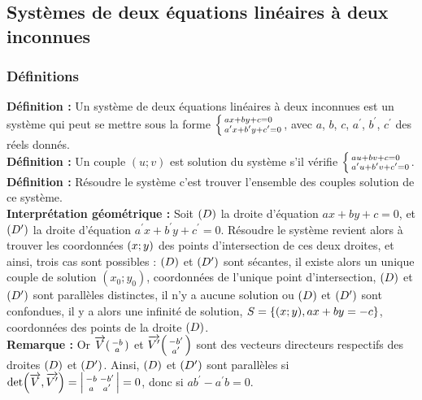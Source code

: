 \documentclass[a4paper,titlepage]{article}
\let\oldleft\left
\renewcommand{\left}{\mathopen{}\mathclose\bgroup\oldleft}
\let\oldright\right
\renewcommand{\right}{\aftergroup\egroup\oldright}
\begin{document}
    \subsection{Systèmes de deux équations linéaires à deux inconnues}
        \subsubsection{Définitions}
            \textbf{Définition :} Un système de deux équations linéaires à deux inconnues est un système qui peut se mettre sous la forme $\left\{\begin{smallmatrix*}[l]ax+by+c=0\\a^{\prime}x+b^{\prime}y+c^{\prime}=0\end{smallmatrix*}\!\right.$, avec $a$, $b$, $c$, $a^{\prime}$, $b^{\prime}$, $c^{\prime}$ des réels donnés.
            \\
            \textbf{Définition :} Un couple $(u;v)$ est solution du système s’il vérifie $\left\{\begin{smallmatrix*}[l]au+bv+c=0\\a^{\prime}u+b^{\prime}v+c^{\prime}=0\end{smallmatrix*}\!\right.$.
            \\
            \textbf{Définition :} Résoudre le système c’est trouver l’ensemble des couples solution de ce système.
            \\
            \textbf{Interprétation géométrique :} Soit $\left(D\right)$ la droite d’équation $ax+by+c=0$, et $\left(D^{\prime}\right)$ la droite d’équation $a^{\prime}x+b^{\prime}y+c^{\prime}=0$. Résoudre le système revient alors à trouver les coordonnées $\left(x;y\right)$ des points d’intersection de ces deux droites, et ainsi, trois cas sont possibles : $\left(D\right)$ et $\left(D^{\prime}\right)$ sont sécantes, il existe alors un unique couple de solution $(x_{0};y_{0})$, coordonnées de l’unique point d’intersection, $\left(D\right)$ et $\left(D^{\prime}\right)$ sont parallèles distinctes, il n’y a aucune solution ou $\left(D\right)$ et $\left(D^{\prime}\right)$ sont confondues, il y a alors une infinité de solution, $S=\left\{\left(x;y\right),ax+by=-c\right\}$, coordonnées des points de la droite $\left(D\right)$.
            \\
            \textbf{Remarque :} Or $\overrightarrow{V}\left(\begin{smallmatrix}-b\\a\end{smallmatrix}\right)$ et $\overrightarrow{V^{\prime}}\left(\begin{smallmatrix}-b^{\prime}\\a^{\prime}\end{smallmatrix}\right)$ sont des vecteurs directeurs respectifs des droites $\left(D\right)$ et $\left(D^{\prime}\right)$. Ainsi, $\left(D\right)$ et $\left(D^{\prime}\right)$ sont parallèles si $\det\left(\overrightarrow{V},\overrightarrow{V^{\prime}}\right)=\left|\begin{smallmatrix}-b&-b^{\prime}\\a&a^{\prime}\end{smallmatrix}\right|=0$, donc si $ab^{\prime}-a^{\prime}b=0$.
\end{document}

